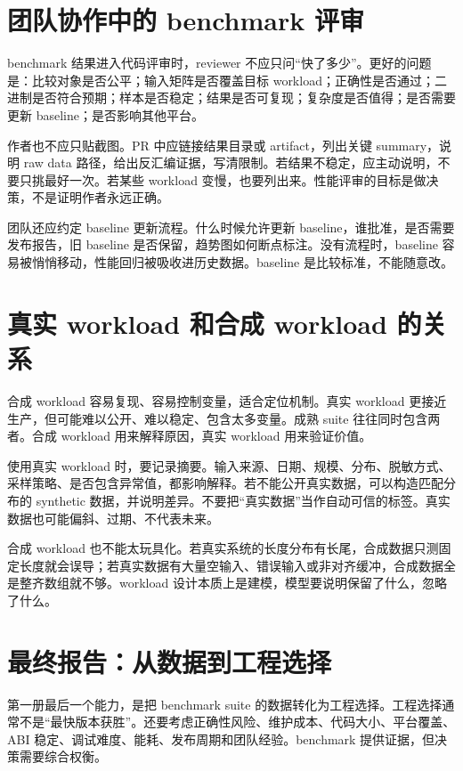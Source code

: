 \section{团队协作中的 benchmark 评审}

benchmark 结果进入代码评审时，reviewer 不应只问“快了多少”。更好的问题是：比较对象是否公平；输入矩阵是否覆盖目标 workload；正确性是否通过；二进制是否符合预期；样本是否稳定；结果是否可复现；复杂度是否值得；是否需要更新 baseline；是否影响其他平台。

作者也不应只贴截图。PR 中应链接结果目录或 artifact，列出关键 summary，说明 raw data 路径，给出反汇编证据，写清限制。若结果不稳定，应主动说明，不要只挑最好一次。若某些 workload 变慢，也要列出来。性能评审的目标是做决策，不是证明作者永远正确。

团队还应约定 baseline 更新流程。什么时候允许更新 baseline，谁批准，是否需要发布报告，旧 baseline 是否保留，趋势图如何断点标注。没有流程时，baseline 容易被悄悄移动，性能回归被吸收进历史数据。baseline 是比较标准，不能随意改。

\section{真实 workload 和合成 workload 的关系}

合成 workload 容易复现、容易控制变量，适合定位机制。真实 workload 更接近生产，但可能难以公开、难以稳定、包含太多变量。成熟 suite 往往同时包含两者。合成 workload 用来解释原因，真实 workload 用来验证价值。

使用真实 workload 时，要记录摘要。输入来源、日期、规模、分布、脱敏方式、采样策略、是否包含异常值，都影响解释。若不能公开真实数据，可以构造匹配分布的 synthetic 数据，并说明差异。不要把“真实数据”当作自动可信的标签。真实数据也可能偏斜、过期、不代表未来。

合成 workload 也不能太玩具化。若真实系统的长度分布有长尾，合成数据只测固定长度就会误导；若真实数据有大量空输入、错误输入或非对齐缓冲，合成数据全是整齐数组就不够。workload 设计本质上是建模，模型要说明保留了什么，忽略了什么。

\section{最终报告：从数据到工程选择}

第一册最后一个能力，是把 benchmark suite 的数据转化为工程选择。工程选择通常不是“最快版本获胜”。还要考虑正确性风险、维护成本、代码大小、平台覆盖、ABI 稳定、调试难度、能耗、发布周期和团队经验。benchmark 提供证据，但决策需要综合权衡。

